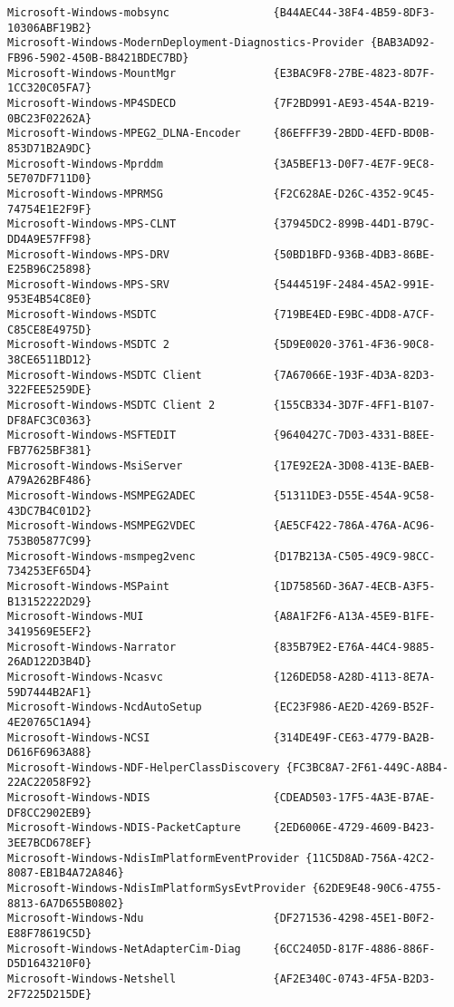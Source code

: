 \documentclass{report}
\begin{document}
\begin{lstlisting}[breaklines=true,basicstyle=\tiny]
Microsoft-Windows-mobsync                {B44AEC44-38F4-4B59-8DF3-10306ABF19B2}
Microsoft-Windows-ModernDeployment-Diagnostics-Provider {BAB3AD92-FB96-5902-450B-B8421BDEC7BD}
Microsoft-Windows-MountMgr               {E3BAC9F8-27BE-4823-8D7F-1CC320C05FA7}
Microsoft-Windows-MP4SDECD               {7F2BD991-AE93-454A-B219-0BC23F02262A}
Microsoft-Windows-MPEG2_DLNA-Encoder     {86EFFF39-2BDD-4EFD-BD0B-853D71B2A9DC}
Microsoft-Windows-Mprddm                 {3A5BEF13-D0F7-4E7F-9EC8-5E707DF711D0}
Microsoft-Windows-MPRMSG                 {F2C628AE-D26C-4352-9C45-74754E1E2F9F}
Microsoft-Windows-MPS-CLNT               {37945DC2-899B-44D1-B79C-DD4A9E57FF98}
Microsoft-Windows-MPS-DRV                {50BD1BFD-936B-4DB3-86BE-E25B96C25898}
Microsoft-Windows-MPS-SRV                {5444519F-2484-45A2-991E-953E4B54C8E0}
Microsoft-Windows-MSDTC                  {719BE4ED-E9BC-4DD8-A7CF-C85CE8E4975D}
Microsoft-Windows-MSDTC 2                {5D9E0020-3761-4F36-90C8-38CE6511BD12}
Microsoft-Windows-MSDTC Client           {7A67066E-193F-4D3A-82D3-322FEE5259DE}
Microsoft-Windows-MSDTC Client 2         {155CB334-3D7F-4FF1-B107-DF8AFC3C0363}
Microsoft-Windows-MSFTEDIT               {9640427C-7D03-4331-B8EE-FB77625BF381}
Microsoft-Windows-MsiServer              {17E92E2A-3D08-413E-BAEB-A79A262BF486}
Microsoft-Windows-MSMPEG2ADEC            {51311DE3-D55E-454A-9C58-43DC7B4C01D2}
Microsoft-Windows-MSMPEG2VDEC            {AE5CF422-786A-476A-AC96-753B05877C99}
Microsoft-Windows-msmpeg2venc            {D17B213A-C505-49C9-98CC-734253EF65D4}
Microsoft-Windows-MSPaint                {1D75856D-36A7-4ECB-A3F5-B13152222D29}
Microsoft-Windows-MUI                    {A8A1F2F6-A13A-45E9-B1FE-3419569E5EF2}
Microsoft-Windows-Narrator               {835B79E2-E76A-44C4-9885-26AD122D3B4D}
Microsoft-Windows-Ncasvc                 {126DED58-A28D-4113-8E7A-59D7444B2AF1}
Microsoft-Windows-NcdAutoSetup           {EC23F986-AE2D-4269-B52F-4E20765C1A94}
Microsoft-Windows-NCSI                   {314DE49F-CE63-4779-BA2B-D616F6963A88}
Microsoft-Windows-NDF-HelperClassDiscovery {FC3BC8A7-2F61-449C-A8B4-22AC22058F92}
Microsoft-Windows-NDIS                   {CDEAD503-17F5-4A3E-B7AE-DF8CC2902EB9}
Microsoft-Windows-NDIS-PacketCapture     {2ED6006E-4729-4609-B423-3EE7BCD678EF}
Microsoft-Windows-NdisImPlatformEventProvider {11C5D8AD-756A-42C2-8087-EB1B4A72A846}
Microsoft-Windows-NdisImPlatformSysEvtProvider {62DE9E48-90C6-4755-8813-6A7D655B0802}
Microsoft-Windows-Ndu                    {DF271536-4298-45E1-B0F2-E88F78619C5D}
Microsoft-Windows-NetAdapterCim-Diag     {6CC2405D-817F-4886-886F-D5D1643210F0}
Microsoft-Windows-Netshell               {AF2E340C-0743-4F5A-B2D3-2F7225D215DE}

\end{lstlisting}
\end{document}
